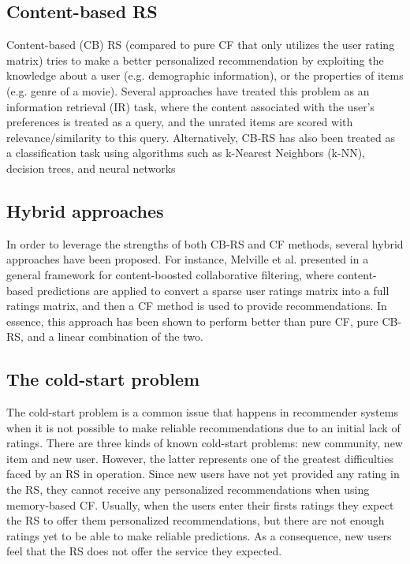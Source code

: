 \subsection{Content-based RS}

Content-based (CB) RS (compared to pure CF that only utilizes the user rating matrix) tries to make a better personalized recommendation by exploiting the knowledge about a user (e.g. demographic information), or the properties of items (e.g. genre of a movie). Several approaches have treated this problem as an information retrieval (IR) task, where the content associated with the user's preferences is treated as a query, and the unrated items are scored with relevance/similarity to this query\cite{balabanovic1997fab}. Alternatively, CB-RS has also been treated as a classification task using algorithms such as k-Nearest Neighbors (k-NN), decision trees, and neural networks\cite{pazzani1997learning}

\subsection{Hybrid approaches}

In order to leverage the strengths of both CB-RS and CF methods, several hybrid approaches have been proposed. For instance, Melville et al. presented in \cite{melville2002content} a general framework for content-boosted collaborative filtering, where content-based predictions are applied to convert a sparse user ratings matrix into a full ratings matrix, and then a CF method is used to provide recommendations. In essence, this approach has been shown to perform better than pure CF, pure CB-RS, and a linear combination of the two.

\subsection{The cold-start problem}

The cold-start problem is a common issue that happens in recommender systems when it is not possible to make reliable recommendations due to an initial lack of ratings. There are three kinds of known cold-start problems: new community, new item and new user\cite{bobadilla2013recommender}. However, the latter represents one of the greatest difficulties faced by an RS in operation. Since new users have not yet provided any rating in the RS, they cannot receive any personalized recommendations when using memory-based CF. Usually, when the users enter their firsts ratings they expect the RS to offer them personalized recommendations, but there are not enough ratings yet to be able to make reliable predictions. As a consequence, new users feel that the RS does not offer the service they expected.

